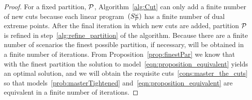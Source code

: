 \documentclass[11pt]{article}
\newcommand{\cQ}{{\cal Q}}
\newcommand{\cP}{{\cal P}}
\renewcommand{\underbar}{\underaccent{\bar}}
\begin{document}
\begin{proof}
		
		For a fixed partition, $\cP$, Algorithm~\ref{alg:Cut} can only add a finite number of new cuts because each linear program~\((S_{\cP}^\omega)\) has a finite number of dual extreme points. After the final iteration in which new cuts are added, partition $\cP$ is refined in step~\ref{alg:refine_partition} of the algorithm. Because there are a finite number of scenarios the finest possible partition, if necessary, will be obtained in a finite number of iterations. From Proposition~\ref{prop:finestPar} we know that with the finest partition the solution to model~\eqref{eqn:proposition_equivalent} yields an optimal solution, and we will obtain the requisite cuts~\eqref{cons:master_the_cuts} so that models~\eqref{prob:masterTightened} and~\eqref{eqn:proposition_equivalent} are equivalent in a finite number of iterations. 
	\end{proof}
	
\end{document}
